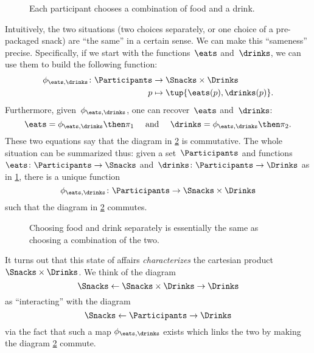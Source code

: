 \begin{figure}[h!]
    \centering
    \caption{Each participant chooses a combination of food and a drink. \label{fig:snacks_2}}
\end{figure}


Intuitively, the two situations (two choices separately, or one choice of a pre-packaged snack) are ``the same'' in a certain sense.
We can make this ``sameness'' precise.
Specifically, if we start with the functions~$\eats$ and~$\drinks$, we can use them to build the following function:
\begin{equation}
    \label{eq:snacks-building-univ-map}
    \begin{aligned}
        \phi_{\eats,\drinks}\colon \Participants&\to \Snacks\times \Drinks\\
        p&\mapsto \tup{\eats(p),\drinks(p)}.
    \end{aligned}
\end{equation}
Furthermore, given~$\phi_{\eats,\drinks}$, one can recover~$\eats$ and~$\drinks$:
\begin{equation}
    \label{eq:snacks-proj-univ-map}
    \eats =\phi_{\eats,\drinks}\then \pi_1 \quad  \text{ and } \quad \drinks=\phi_{\eats,\drinks}\then \pi_2.
\end{equation}
These two equations say that the diagram in \cref{fig:snacks_3} is commutative.
The whole situation can be summarized thus: given a set~$\Participants$ and functions~$\eats\colon \Participants \to \Snacks$ and~$\drinks\colon \Participants \to \Drinks$ as in \cref{fig:snacks_2}, there is a unique function~
\begin{equation}
    \label{eq:snacks-unique-univ-map}
    \phi_{\eats,\drinks} \colon \Participants \to \Snacks \times \Drinks
\end{equation}
such that the diagram in \cref{fig:snacks_3} commutes.

\begin{figure}[h!]
    \centering
    \caption{Choosing food and drink separately is essentially the same as choosing a combination of the two. }
    \label{fig:snacks_3}
\end{figure}

It turns out that this state of affairs \emph{characterizes} the cartesian product $\Snacks\times \Drinks$. We think of the diagram
\begin{equation}
    \label{eq:snacks-prod-diagram}
    \Snacks \leftarrow \Snacks \times \Drinks \rightarrow \Drinks
\end{equation}
as ``interacting'' with the diagram
\begin{equation}
    \label{eq:snacks-prod-test-diagram}
    \Snacks \leftarrow \Participants \rightarrow \Drinks
\end{equation}
via the fact that such a map $\phi_{\eats,\drinks}$ exists which links the two by making the diagram \cref{fig:snacks_3} commute.

